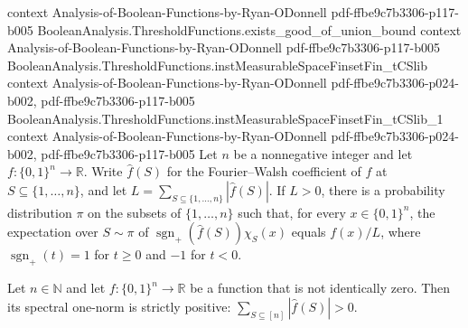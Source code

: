 \begin{theorem}
  {context}
  {Analysis-of-Boolean-Functions-by-Ryan-ODonnell}
  {pdf-ffbe9c7b3306-p117-b005}
\proofstep
  {BooleanAnalysis.ThresholdFunctions.exists_good_of_union_bound}
  {context}
  {Analysis-of-Boolean-Functions-by-Ryan-ODonnell}
  {pdf-ffbe9c7b3306-p117-b005}
\proofstep
  {BooleanAnalysis.ThresholdFunctions.instMeasurableSpaceFinsetFin_tCSlib}
  {context}
  {Analysis-of-Boolean-Functions-by-Ryan-ODonnell}
  {pdf-ffbe9c7b3306-p024-b002,
    pdf-ffbe9c7b3306-p117-b005}
\proofstep
  {BooleanAnalysis.ThresholdFunctions.instMeasurableSpaceFinsetFin_tCSlib_1}
  {context}
  {Analysis-of-Boolean-Functions-by-Ryan-ODonnell}
  {pdf-ffbe9c7b3306-p024-b002,
    pdf-ffbe9c7b3306-p117-b005}
Let $n$ be a nonnegative integer and let $f:\{0,1\}^n\to\mathbb R$. Write $\widehat
f(S)$ for the Fourier–Walsh coefficient of $f$ at $S\subseteq\{1,\ldots,n\}$, and let
$L=\sum_{S\subseteq\{1,\ldots,n\}}|\widehat f(S)|$. If $L>0$, there is a probability
distribution $\pi$ on the subsets of $\{1,\ldots,n\}$ such that, for every
$x\in\{0,1\}^n$, the expectation over $S\sim\pi$ of $\operatorname{sgn}_+(\widehat
f(S))\chi_S(x)$ equals $f(x)/L$, where $\operatorname{sgn}_+(t)=1$ for $t\ge0$ and $-1$
for $t<0$.
\end{theorem}

\begin{theorem}
\leanok
{}
Let $n\in\mathbb N$ and let $f:\{0,1\}^n\to\mathbb R$ be a function that is not
identically zero. Then its spectral one-norm is strictly positive:
$\sum_{S\subseteq[n]}|\widehat f(S)|>0$.
\end{theorem}

